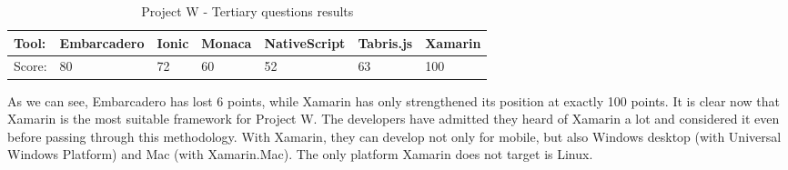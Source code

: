 \documentclass[english,master,public,dept460,male,cpdeclaration,oneside]{diploma}
\begin{document}
\begin{table}[!h]
	\centering
	\caption{Project W - Tertiary questions results}
	\begin{tabular}{p{2cm} | p{1.5cm} | p{1.5cm} | p{1.5cm} | p{1.5cm} | p{1.5cm} | p{1.5cm}}
		\toprule		
		\textbf{Tool:} & \textbf{Embarcadero} & \textbf{Ionic} & \textbf{Monaca} & \textbf{NativeScript} & \textbf{Tabris.js} & \textbf{Xamarin} \\
		\midrule
		Score: & 80 & 72 & 60 & 52 & 63 & 100 \\		
		\midrule
	\end{tabular}
\end{table}

As we can see, Embarcadero has lost 6 points, while Xamarin has only strengthened its position at exactly 100 points. It is clear now that Xamarin is the most suitable framework for Project W. The developers have admitted they heard of Xamarin a lot and considered it even before passing through this methodology. With Xamarin, they can develop not only for mobile, but also Windows desktop (with Universal Windows Platform) and Mac (with Xamarin.Mac). The only platform Xamarin does not target is Linux.
\end{document}
